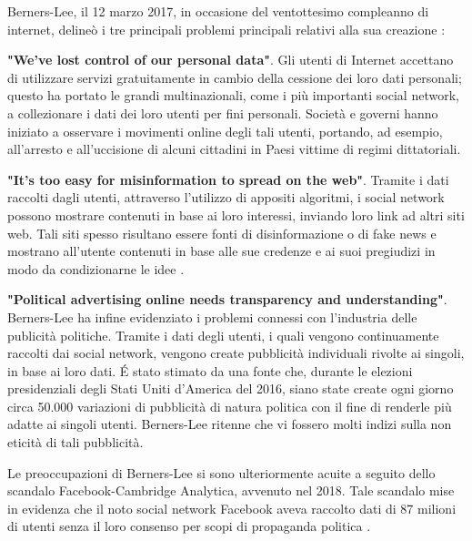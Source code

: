 \bigskip
\bigskip

Berners-Lee, il 12 marzo 2017, in occasione del ventottesimo compleanno di internet, delineò i tre principali problemi principali relativi alla sua creazione \cite{worldwideweb}:

\bigskip
\bigskip

\textbf{"We’ve lost control of our personal data"}. Gli utenti di Internet accettano di utilizzare servizi gratuitamente in cambio della cessione dei loro dati personali; questo ha portato le grandi multinazionali, come i più importanti social network, a collezionare i dati dei loro utenti per fini personali. Società e governi hanno iniziato a osservare i movimenti online degli tali utenti, portando, ad esempio, all'arresto e all'uccisione di alcuni cittadini in Paesi vittime di regimi dittatoriali. \cite{bloggers}

\bigskip
\bigskip

\textbf{"It’s too easy for misinformation to spread on the web"}. Tramite i dati raccolti dagli utenti, attraverso l'utilizzo di appositi algoritmi, i social network possono mostrare contenuti in base ai loro interessi, inviando loro link ad altri siti web. Tali siti spesso risultano essere fonti di disinformazione o di fake news e mostrano all'utente contenuti in base alle sue credenze e ai suoi pregiudizi in modo da condizionarne le idee \cite{nyt}\label{key}.

\bigskip
\bigskip

\textbf{"Political advertising online needs transparency and understanding"}. Berners-Lee ha infine evidenziato i problemi connessi con l'industria delle publicità politiche. Tramite i dati degli utenti, i quali vengono continuamente raccolti dai social network, vengono create pubblicità individuali rivolte ai singoli, in base ai loro dati. É stato stimato da una fonte \cite{guardian} che, durante le elezioni presidenziali degli Stati Uniti d'America del 2016, siano state create ogni giorno circa 50.000 variazioni di pubblicità di natura politica con il fine di renderle più adatte ai singoli utenti. Berners-Lee ritenne che vi fossero molti indizi sulla non eticità di tali pubblicità.

\bigskip
\bigskip

Le preoccupazioni di Berners-Lee si sono ulteriormente acuite a seguito dello scandalo Facebook-Cambridge Analytica, avvenuto nel 2018. Tale scandalo mise in evidenza che il noto social network Facebook aveva raccolto dati di 87 milioni di utenti senza il loro consenso per scopi di propaganda politica \cite{facebook}. 

